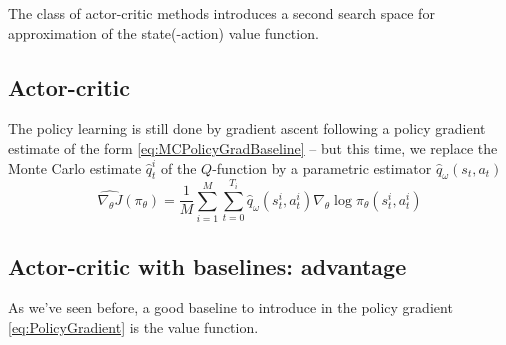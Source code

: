 \documentclass[12pt]{report}
\begin{document}
The class of actor-critic methods introduces a second search space for approximation of the state(-action) value function.


\subsection{Actor-critic}


The policy learning is still done by gradient ascent following a policy gradient estimate of the form \cref{eq:MCPolicyGradBaseline} -- but this time, we replace the Monte Carlo estimate $\hat{q}^i_t$ of the $Q$-function by a parametric estimator $\hat{q}_\omega(s_t, a_t)$
\begin{equation}\label{eq:ActorPolicyGrad}
	\widehat{\nabla_\theta J}(\pi_\theta) =
	\frac{1}{M}\sum_{i=1}^M
	\sum_{t=0}^{T_i} \hat{q}_\omega(s^i_t,a^i_t)
	\nabla_\theta \log\pi_\theta(s^i_t, a^i_t)
\end{equation}

\subsection{Actor-critic with baselines: advantage}

As we've seen before, a good baseline to introduce in the policy gradient \eqref{eq:PolicyGradient} is the value function.



\nocite{*}
\printbibliography
\end{document}
